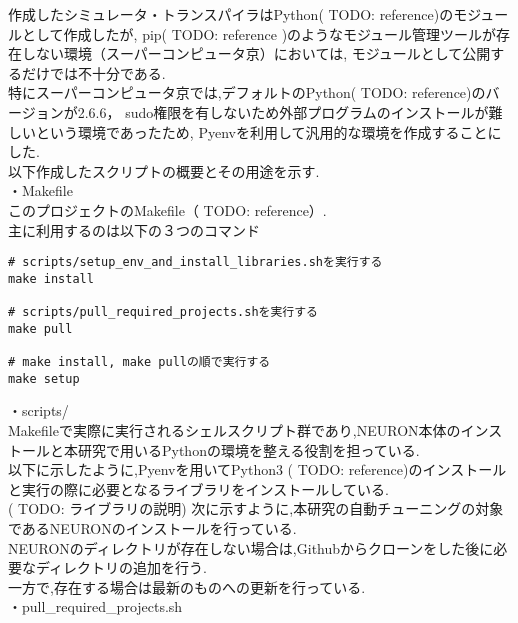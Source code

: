 作成したシミュレータ・トランスパイラはPython( TODO: reference)のモジュールとして作成したが,
pip( TODO: reference )のようなモジュール管理ツールが存在しない環境（スーパーコンピュータ京）においては,
モジュールとして公開するだけでは不十分である.\\
特にスーパーコンピュータ京では,デフォルトのPython( TODO: reference)のバージョンが2.6.6，
sudo権限を有しないため外部プログラムのインストールが難しいという環境であったため,
Pyenvを利用して汎用的な環境を作成することにした.\\
以下作成したスクリプトの概要とその用途を示す.\\
・Makefile\\
このプロジェクトのMakefile（ TODO: reference）.\\
主に利用するのは以下の３つのコマンド\\
{\footnotesize
\begin{lstlisting}[numbers=none]
# scripts/setup_env_and_install_libraries.shを実行する
make install

# scripts/pull_required_projects.shを実行する
make pull

# make install, make pullの順で実行する
make setup
\end{lstlisting}
}
・scripts/\\
Makefileで実際に実行されるシェルスクリプト群であり,NEURON本体のインストールと本研究で用いるPythonの環境を整える役割を担っている.\\
以下に示したように,Pyenvを用いてPython3 ( TODO: reference)のインストールと実行の際に必要となるライブラリをインストールしている.\\
( TODO: ライブラリの説明)
\indent {\footnotesize

}
次に示すように,本研究の自動チューニングの対象であるNEURONのインストールを行っている.\\
NEURONのディレクトリが存在しない場合は,Githubからクローンをした後に必要なディレクトリの追加を行う.\\
一方で,存在する場合は最新のものへの更新を行っている.\\
\indent ・pull\_required\_projects.sh\\
\indent {\footnotesize

}
